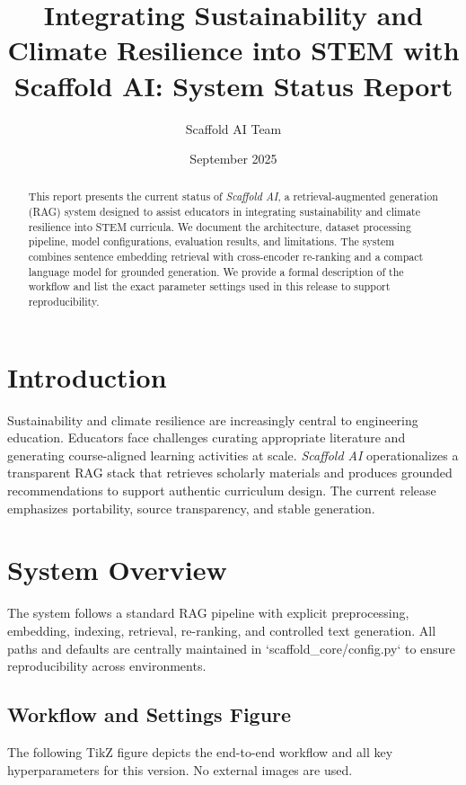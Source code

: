 \documentclass[11pt]{article}
\title{Integrating Sustainability and Climate Resilience into STEM with Scaffold AI: System Status Report}
\author{Scaffold AI Team}
\date{September 2025}
\begin{document}
\maketitle

\begin{abstract}
This report presents the current status of \emph{Scaffold AI}, a retrieval-augmented generation (RAG) system designed to assist educators in integrating sustainability and climate resilience into STEM curricula. We document the architecture, dataset processing pipeline, model configurations, evaluation results, and limitations. The system combines sentence embedding retrieval with cross-encoder re-ranking and a compact language model for grounded generation. We provide a formal description of the workflow and list the exact parameter settings used in this release to support reproducibility.
\end{abstract}

\section{Introduction}
Sustainability and climate resilience are increasingly central to engineering education. Educators face challenges curating appropriate literature and generating course-aligned learning activities at scale. \textit{Scaffold AI} operationalizes a transparent RAG stack that retrieves scholarly materials and produces grounded recommendations to support authentic curriculum design. The current release emphasizes portability, source transparency, and stable generation.

\section{System Overview}
The system follows a standard RAG pipeline with explicit preprocessing, embedding, indexing, retrieval, re-ranking, and controlled text generation. All paths and defaults are centrally maintained in `scaffold\_core/config.py` to ensure reproducibility across environments.

\subsection*{Workflow and Settings Figure}
The following TikZ figure depicts the end-to-end workflow and all key hyperparameters for this version. No external images are used.

\begin{center}

\end{center}
\end{document}
